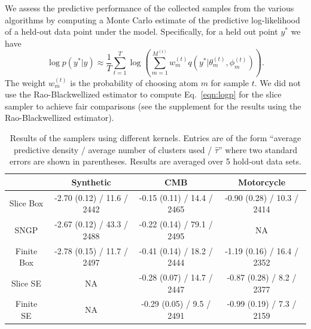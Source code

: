 We assess the predictive performance of the collected samples from the various
algorithms by computing a Monte Carlo estimate of the predictive log-likelihood 
of a held-out data point under the model.  Specifically, for a held out point
$y^*$ we have
\begin{equation}
  \log p(y^*|y) \approx \frac{1}{T} \sum_{t=1}^T \log \left ( \sum_{m=1}^{M^{(t)}}
  w^{(t)}_m q \left ( y^*|\theta^{(t)}_m,\phi^{(t)}_m \right )  \right ).
  \label{eqn:logp}
\end{equation}
The weight $w^{(t)}_m$ is the probability of choosing atom $m$ for sample $t$.
We did not use the Rao-Blackwellized estimator to compute
Eq.~\ref{eqn:logp} for the slice sampler to achieve fair comparisons (see
the supplement for the results using the Rao-Blackwellized estimator).

\begin{table}
  \centering
  \caption{Results of the samplers using different kernels.  Entries
  are of the form ``average predictive density / average number of clusters used /
  $\hat{\tau}$'' where two standard errors are shown in parentheses.  Results are 
  averaged over 5 hold-out data sets.}
  \vspace{3pt}
  \begin{tabular}{|c|c|c|c|}
    \hline
    & \textbf{Synthetic} & \textbf{CMB} & \textbf{Motorcycle} \\
    \hline
    Slice Box  & -2.70 (0.12) / 11.6 / 2442 & -0.15 (0.11) / 14.4 / 2465 & -0.90 (0.28) / 10.3 / 2414  \\
    \hline
    SNGP       & -2.67 (0.12) / 43.3 / 2488 & -0.22 (0.14) / 79.1 / 2495 & NA \\
    \hline
    Finite Box & -2.78 (0.15) / 11.7 / 2497 & -0.41 (0.14) / 18.2 / 2444 & -1.19 (0.16) / 16.4 / 2352  \\
    \hline
    Slice SE   & NA                         & -0.28 (0.07) / 14.7 / 2447 & -0.87 (0.28) / 8.2 / 2377 \\
    \hline
    Finite SE  & NA                         & -0.29 (0.05) / 9.5 / 2491 & -0.99 (0.19) / 7.3 / 2159 \\
    \hline
  \end{tabular}
  \label{tab:mcmc}
\end{table}


